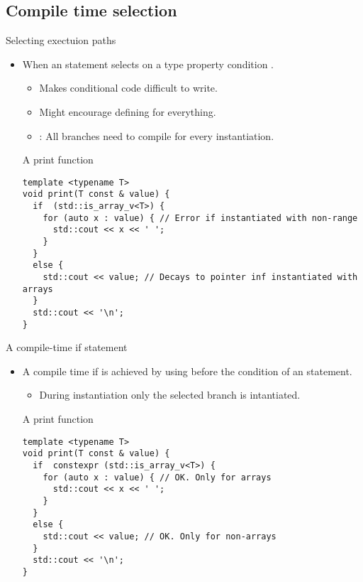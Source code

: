 \subsection{Compile time selection}

\begin{frame}[t,fragile]{Selecting exectuion paths}
\begin{itemize}
  \item When an  statement selects on a type property 
        condition .
    \begin{itemize}
      \item Makes conditional code difficult to write.
      \item Might encourage defining  for everything.
      \item {}: All branches need to compile for every instantiation.
    \end{itemize}

\begin{block}{A print function}
\begin{lstlisting}[basicstyle=\mode<presentation>{\tiny}]
template <typename T>
void print(T const & value) {
  if  (std::is_array_v<T>) {
    for (auto x : value) { // Error if instantiated with non-range
      std::cout << x << ' ';
    }
  }
  else {
    std::cout << value; // Decays to pointer inf instantiated with arrays
  }
  std::cout << '\n';
}
\end{lstlisting}
\end{block}

\end{itemize}
\end{frame}

\begin{frame}[t,fragile]{A compile-time if statement}
\begin{itemize}
  \item A compile time if is achieved by using  before the condition
        of an  statement.
    \begin{itemize}
      \item During instantiation only the selected branch is intantiated.
    \end{itemize}

\begin{block}{A print function}
\begin{lstlisting}[basicstyle=\mode<presentation>{\tiny}]
template <typename T>
void print(T const & value) {
  if  constexpr (std::is_array_v<T>) {
    for (auto x : value) { // OK. Only for arrays
      std::cout << x << ' ';
    }
  }
  else {
    std::cout << value; // OK. Only for non-arrays
  }
  std::cout << '\n';
}
\end{lstlisting}
\end{block}

\end{itemize}
\end{frame}
